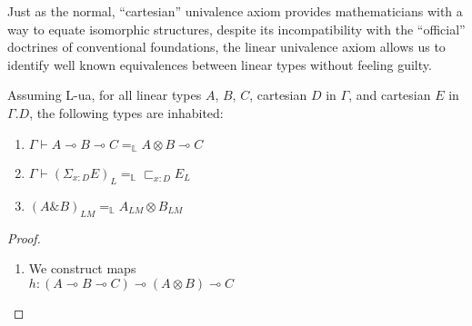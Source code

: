 \documentclass[a4paper,english]{lipics-v2018}
\begin{document}
Just as the normal, ``cartesian'' univalence axiom provides mathematicians with a way to equate isomorphic structures, despite its incompatibility with the ``official'' doctrines of conventional foundations, the linear univalence axiom allows us to identify well known equivalences between linear types without feeling guilty.
  \begin{theorem}
    Assuming L-ua, for all linear types $A$, $B$, $C$, cartesian $D$ in $\Gamma$, and cartesian $E$ in $\Gamma.D$, the following types are inhabited:
    \begin{enumerate}
    \item $\Gamma \vdash A \multimap B \multimap C =_{\mathbb{L}} A \otimes B \multimap C$
    \item $\Gamma \vdash (\Sigma_{x : D}E)_L =_{\mathbb{L}}\sqsubset_{x :D}E_L$
    \item $(A \& B)_{LM} =_{\mathbb{L}} A_{LM} \otimes B_{LM}$
    \end{enumerate}
    \begin{proof}
      \begin{enumerate}
      \item We construct maps \\
      \footnotesize
      $h : (A \multimap B \multimap C) \multimap (A \otimes B) \multimap C$


\end{enumerate}
\end{proof}
\end{theorem}
\end{document}
